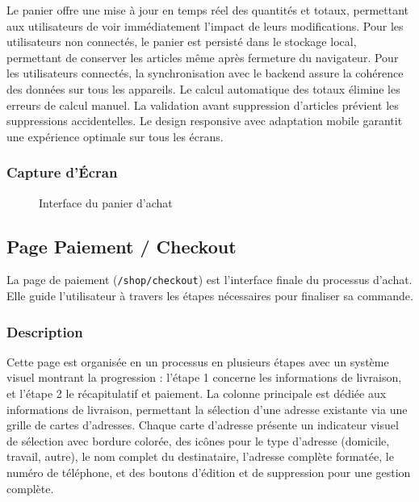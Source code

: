\documentclass[12pt,a4paper]{article}
\begin{document}
Le panier offre une mise à jour en temps réel des quantités et totaux, permettant aux utilisateurs de voir immédiatement l'impact de leurs modifications. Pour les utilisateurs non connectés, le panier est persisté dans le stockage local, permettant de conserver les articles même après fermeture du navigateur. Pour les utilisateurs connectés, la synchronisation avec le backend assure la cohérence des données sur tous les appareils. Le calcul automatique des totaux élimine les erreurs de calcul manuel. La validation avant suppression d'articles prévient les suppressions accidentelles. Le design responsive avec adaptation mobile garantit une expérience optimale sur tous les écrans.

\subsubsection{Capture d'Écran}

\begin{figure}[H]
    \centering
    \caption{Interface du panier d'achat}
    \label{fig:cart}
\end{figure}

\subsection{Page Paiement / Checkout}

La page de paiement (\texttt{/shop/checkout}) est l'interface finale du processus d'achat. Elle guide l'utilisateur à travers les étapes nécessaires pour finaliser sa commande.

\subsubsection{Description}

Cette page est organisée en un processus en plusieurs étapes avec un système visuel montrant la progression : l'étape 1 concerne les informations de livraison, et l'étape 2 le récapitulatif et paiement. La colonne principale est dédiée aux informations de livraison, permettant la sélection d'une adresse existante via une grille de cartes d'adresses. Chaque carte d'adresse présente un indicateur visuel de sélection avec bordure colorée, des icônes pour le type d'adresse (domicile, travail, autre), le nom complet du destinataire, l'adresse complète formatée, le numéro de téléphone, et des boutons d'édition et de suppression pour une gestion complète.
\end{document}
